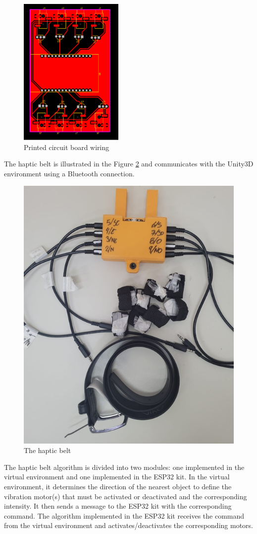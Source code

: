         \begin{figure}[htbp]
            \centering
            \includegraphics[width=0.45\textwidth, angle = 90, origin = c]{Metodologia/PCB Cinto.pdf}
            \caption{Printed circuit board wiring}
            \label{fig:pcb_wiring}
        \end{figure}

        The haptic belt is illustrated in the Figure \ref{fig:cinto_haptico} and communicates with the Unity3D environment using a Bluetooth connection.

        \begin{figure}[!htb]
            \centering
            \includegraphics[width = 0.5\linewidth]{Metodologia/Cinto Haptico.png}
            \caption{The haptic belt}
            \label{fig:cinto_haptico}
        \end{figure}

        The haptic belt algorithm is divided into two modules: one implemented in the virtual environment and one implemented in the ESP32 kit. In the virtual environment, it determines the direction of the nearest object to define the vibration motor(s) that must be activated or deactivated and the corresponding intensity. It then sends a message to the ESP32 kit with the corresponding command. The algorithm implemented in the ESP32 kit receives the command from the virtual environment and activates/deactivates the corresponding motors.

